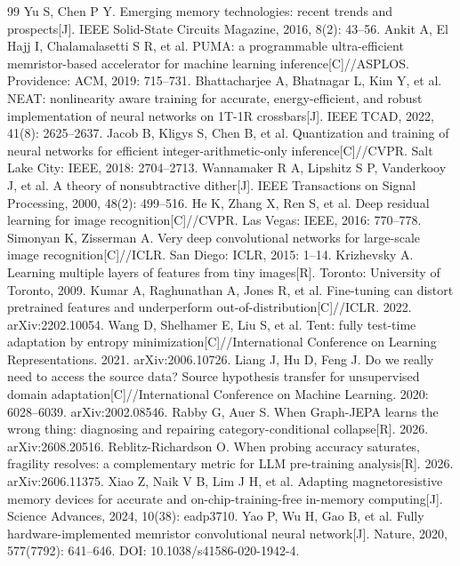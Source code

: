 \documentclass[11pt,a4paper]{ctexart}
\begin{document}
\begin{thebibliography}{99}
 Yu S, Chen P Y. Emerging memory technologies: recent trends and prospects[J]. IEEE Solid-State Circuits Magazine, 2016, 8(2): 43--56.
 Ankit A, El Hajj I, Chalamalasetti S R, et al. PUMA: a programmable ultra-efficient memristor-based accelerator for machine learning inference[C]//ASPLOS. Providence: ACM, 2019: 715--731.
 Bhattacharjee A, Bhatnagar L, Kim Y, et al. NEAT: nonlinearity aware training for accurate, energy-efficient, and robust implementation of neural networks on 1T-1R crossbars[J]. IEEE TCAD, 2022, 41(8): 2625--2637.
 Jacob B, Kligys S, Chen B, et al. Quantization and training of neural networks for efficient integer-arithmetic-only inference[C]//CVPR. Salt Lake City: IEEE, 2018: 2704--2713.
 Wannamaker R A, Lipshitz S P, Vanderkooy J, et al. A theory of nonsubtractive dither[J]. IEEE Transactions on Signal Processing, 2000, 48(2): 499--516.
 He K, Zhang X, Ren S, et al. Deep residual learning for image recognition[C]//CVPR. Las Vegas: IEEE, 2016: 770--778.
 Simonyan K, Zisserman A. Very deep convolutional networks for large-scale image recognition[C]//ICLR. San Diego: ICLR, 2015: 1--14.
 Krizhevsky A. Learning multiple layers of features from tiny images[R]. Toronto: University of Toronto, 2009.
 Kumar A, Raghunathan A, Jones R, et al. Fine-tuning can distort pretrained features and underperform out-of-distribution[C]//ICLR. 2022. arXiv:2202.10054.
 Wang D, Shelhamer E, Liu S, et al. Tent: fully test-time adaptation by entropy minimization[C]//International Conference on Learning Representations. 2021. arXiv:2006.10726.
 Liang J, Hu D, Feng J. Do we really need to access the source data? Source hypothesis transfer for unsupervised domain adaptation[C]//International Conference on Machine Learning. 2020: 6028--6039. arXiv:2002.08546.
 Rabby G, Auer S. When Graph-JEPA learns the wrong thing: diagnosing and repairing category-conditional collapse[R]. 2026. arXiv:2608.20516.
 Reblitz-Richardson O. When probing accuracy saturates, fragility resolves: a complementary metric for LLM pre-training analysis[R]. 2026. arXiv:2606.11375.
 Xiao Z, Naik V B, Lim J H, et al. Adapting magnetoresistive memory devices for accurate and on-chip-training-free in-memory computing[J]. Science Advances, 2024, 10(38): eadp3710.
 Yao P, Wu H, Gao B, et al. Fully hardware-implemented memristor convolutional neural network[J]. Nature, 2020, 577(7792): 641--646. DOI: 10.1038/s41586-020-1942-4.

\end{thebibliography}
\end{document}
